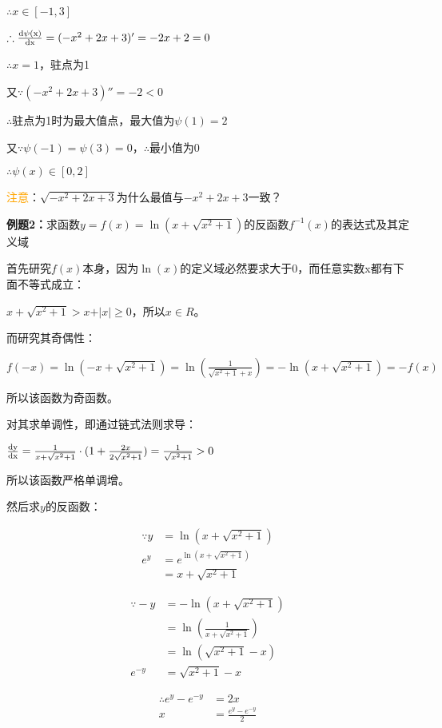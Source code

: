 \documentclass[UTF8, 12pt]{ctexart}
\begin{document}
$\therefore x\in[-1,3]$

$\therefore\frac{\rm{d}\psi(x)}{\rm{d}x}=(-x^2+2x+3)'=-2x+2=0$

$\therefore x=1$，驻点为1

又$\because(-x^2+2x+3)''=-2<0$

$\therefore$驻点为1时为最大值点，最大值为$\psi(1)=2$

又$\because\psi(-1)=\psi(3)=0$，$\therefore$最小值为0

$\therefore\psi(x)\in[0,2]$

\textcolor{orange}{注意}：$\sqrt{-x^2+2x+3}$为什么最值与$-x^2+2x+3$一致？

\textbf{例题2：}求函数$y=f(x)=\ln(x+\sqrt{x^2+1})$的反函数$f^{-1}(x)$的表达式及其定义域

首先研究$f(x)$本身，因为$\ln(x)$的定义域必然要求大于0，而任意实数x都有下面不等式成立：

$x+\sqrt{x^2+1}>x+\vert x\vert \geqslant 0$，所以$x\in R$。

而研究其奇偶性：

$f(-x)=\ln(-x+\sqrt{x^2+1})=\ln(\frac{1}{\sqrt{x^2+1}+x})=-\ln(x+\sqrt{x^2+1})=-f(x)$

所以该函数为奇函数。

对其求单调性，即通过链式法则求导：

$\frac{\rm{d}y}{\rm{d}x}=\frac{1}{x+\sqrt{x^2+1}}\cdot (1+\frac{2x}{2\sqrt{x^2+1}})=\frac{1}{\sqrt{x^2+1}}>0$

所以该函数严格单调增。

然后求$y$的反函数：

$$
    \begin{aligned}
        \because y & =\ln(x+\sqrt{x^2+1})     \\
        e^y        & =e^{\ln(x+\sqrt{x^2+1})} \\
                   & =x+\sqrt{x^2+1}
    \end{aligned}
$$

$$
    \begin{aligned}
        \because -y & =-\ln(x+\sqrt{x^2+1})          \\
                    & =\ln(\frac{1}{x+\sqrt{x^2+1}}) \\
                    & =\ln(\sqrt{x^2+1}-x)           \\
        e^{-y}      & =\sqrt{x^2+1}-x
    \end{aligned}
$$

$$
    \begin{aligned}
        \therefore e^y-e^{-y} & =2x                   \\
        x                     & =\frac{e^y-e^{-y}}{2}
    \end{aligned}
$$
\end{document}
